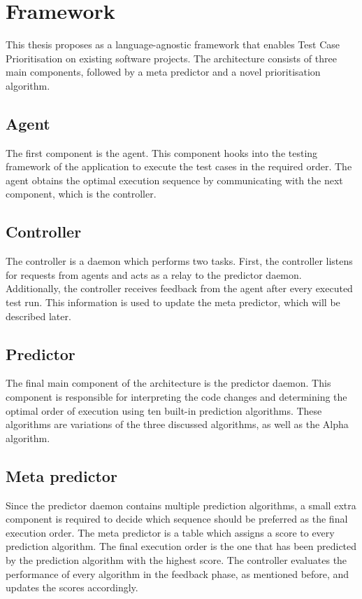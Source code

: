 \section{Framework}
\noindent This thesis proposes \velocity{} as a language-agnostic framework that enables Test Case Prioritisation on existing software projects. The architecture consists of three main components, followed by a meta predictor and a novel prioritisation algorithm.

\subsection{Agent}
\noindent The first component is the agent. This component hooks into the testing framework of the application to execute the test cases in the required order. The agent obtains the optimal execution sequence by communicating with the next component, which is the controller.

\subsection{Controller}
\noindent The controller is a daemon which performs two tasks. First, the controller listens for requests from agents and acts as a relay to the predictor daemon. Additionally, the controller receives feedback from the agent after every executed test run. This information is used to update the meta predictor, which will be described later.

\subsection{Predictor}
\noindent The final main component of the architecture is the predictor daemon. This component is responsible for interpreting the code changes and determining the optimal order of execution using ten built-in prediction algorithms. These algorithms are variations of the three discussed algorithms, as well as the Alpha algorithm.

\subsection{Meta predictor}
\noindent Since the predictor daemon contains multiple prediction algorithms, a small extra component is required to decide which sequence should be preferred as the final execution order. The meta predictor is a table which assigns a score to every prediction algorithm. The final execution order is the one that has been predicted by the prediction algorithm with the highest score. The controller evaluates the performance of every algorithm in the feedback phase, as mentioned before, and updates the scores accordingly.

